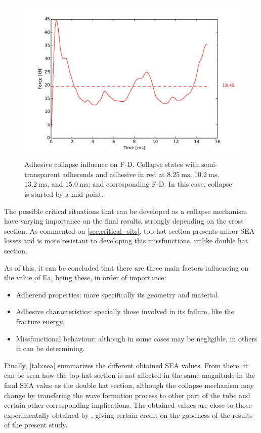 \documentclass[
documentsize = a4, %
font = cmr, %
typesize = 11, %
printmode = true,
onehalfspacing = true,
language = en, %
titlepage = udciccp, %
degree = pt, %
dedication = true,
acknowledgements = true,
abstract-en = true,
abstract-es = false,
abstract-ga = false,
epigraphs = true,
toc = true,
lof = true,
lot = true,
frontmatterintoc = false,
notation = false,
minimal = false,
]{UDCthesis}
\begin{document}
\begin{figure}
\begin{minipage}[b]{.6\linewidth}
		\includegraphics[width=\linewidth]{IMG_CUTRES/AR_RSb}
	\end{minipage}
\caption[Adhesive collapse influence on \acrlong{F-D}.]{Adhesive collapse influence on \acrlong{F-D}. Collapse states with semi-transparent adherends and adhesive in red at $\SI{8.25}{\ms}$, $\SI{10.2}{\ms}$, $\SI{13.2}{\ms}$, and $\SI{15.0}{\ms}$; and corresponding \gls{F-D}. In this case, collapse is started by a mid-point.}
\label{fig:ads_collapse_progresion}
\end{figure}

The possible critical situations that can be developed as a collapse mechanism have varying importance on the final results, strongly depending on the cross section. As commented on \cref{sec:critical_sits}, top-hat section presents minor \gls{SEA} losses and is more resistant to developing this missfunctions, unlike double hat section.

As of this, it can be concluded that there are three main factors influencing on the value of \gls{Ea}, being these, in order of importance:
\begin{itemize}
	\item Adherend properties: more specifically its geometry and material.
	\item Adhesive characteristics: specially those involved in its failure, like the fracture energy.
	\item Missfunctional behaviour: although in some cases may be negligible, in others it can be determining.
\end{itemize}

Finally, \cref{tab:sea} summarizes the different obtained \gls{SEA} values. From there, it can be seen how the top-hat section is not affected in the same magnitude in the final \gls{SEA} value as the double hat section, although the collapse mechanism may change by transfering the wave formation process to other part of the tube and certain other corresponding implications. The obtained values are close to those experimentally obtained by \citet{Peroni2009}, giving certain credit on the goodness of the results of the present study.
\end{document}
